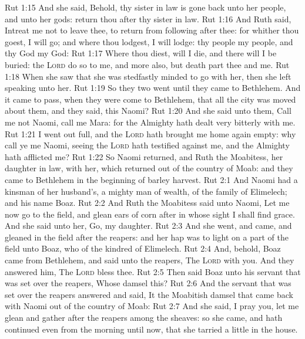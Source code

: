 \vs Rut 1:15 And she said, Behold, thy sister in law is gone back unto her people, and unto her gods: return thou after thy sister in law.
\vs Rut 1:16 And Ruth said, Intreat me not to leave thee,  to return from following after thee: for whither thou goest, I will go; and where thou lodgest, I will lodge: thy people  my people, and thy God my God:
\vs Rut 1:17 Where thou diest, will I die, and there will I be buried: the \textsc{Lord} do so to me, and more also,  but death part thee and me.
\vs Rut 1:18 When she saw that she was stedfastly minded to go with her, then she left speaking unto her.
\vs Rut 1:19 So they two went until they came to Bethlehem. And it came to pass, when they were come to Bethlehem, that all the city was moved about them, and they said,  this Naomi?
\vs Rut 1:20 And she said unto them, Call me not Naomi, call me Mara: for the Almighty hath dealt very bitterly with me.
\vs Rut 1:21 I went out full, and the \textsc{Lord} hath brought me home again empty: why  call ye me Naomi, seeing the \textsc{Lord} hath testified against me, and the Almighty hath afflicted me?
\vs Rut 1:22 So Naomi returned, and Ruth the Moabitess, her daughter in law, with her, which returned out of the country of Moab: and they came to Bethlehem in the beginning of barley harvest.
\vs Rut 2:1 And Naomi had a kinsman of her husband's, a mighty man of wealth, of the family of Elimelech; and his name  Boaz.
\vs Rut 2:2 And Ruth the Moabitess said unto Naomi, Let me now go to the field, and glean ears of corn after  in whose sight I shall find grace. And she said unto her, Go, my daughter.
\vs Rut 2:3 And she went, and came, and gleaned in the field after the reapers: and her hap was to light on a part of the field  unto Boaz, who  of the kindred of Elimelech.
\vs Rut 2:4 And, behold, Boaz came from Bethlehem, and said unto the reapers, The \textsc{Lord}  with you. And they answered him, The \textsc{Lord} bless thee.
\vs Rut 2:5 Then said Boaz unto his servant that was set over the reapers, Whose damsel  this?
\vs Rut 2:6 And the servant that was set over the reapers answered and said, It  the Moabitish damsel that came back with Naomi out of the country of Moab:
\vs Rut 2:7 And she said, I pray you, let me glean and gather after the reapers among the sheaves: so she came, and hath continued even from the morning until now, that she tarried a little in the house.

